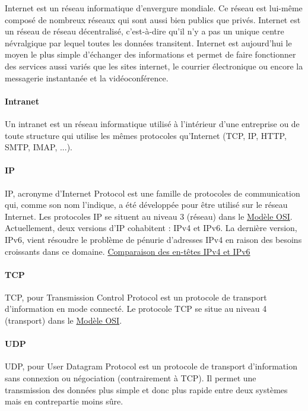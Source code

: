 \documentclass[french]{article}
\begin{document}
Internet est un réseau informatique d'envergure mondiale. Ce réseau est lui-même composé de nombreux réseaux qui sont aussi bien publics que privés. Internet est un réseau de réseau décentralisé, c'est-à-dire qu'il n'y a pas un unique centre névralgique par lequel toutes les données transitent.
Internet est aujourd'hui le moyen le plus simple d'échanger des informations et permet de faire fonctionner des services aussi variés que les sites internet, le courrier électronique ou encore la messagerie instantanée et la vidéoconférence.

\paragraph{Intranet}

Un intranet est un réseau informatique utilisé à l'intérieur d'une entreprise ou de toute structure qui utilise les mêmes protocoles qu'Internet (TCP, IP, HTTP, SMTP, IMAP, ...).

\paragraph{IP}

IP, acronyme d'Internet Protocol est une famille de protocoles de communication qui, comme son nom l'indique, a été développée pour être utilisé sur le réseau Internet.
Les protocoles IP se situent au niveau 3 (réseau) dans le \hyperlink{modele_osi}{Modèle OSI}.
Actuellement, deux versions d'IP cohabitent : IPv4 et IPv6. La dernière version, IPv6, vient résoudre le problème de pénurie d'adresses IPv4 en raison des besoins croissants dans ce domaine.
\hyperlink{ipv4_vs_ipv6}{Comparaison des en-têtes IPv4 et IPv6}

\paragraph{TCP}

TCP, pour Transmission Control Protocol est un protocole de transport d'information en mode connecté.
Le protocole TCP se situe au niveau 4 (transport) dans le \hyperlink{modele_osi}{Modèle OSI}.

\paragraph{UDP}

UDP, pour User Datagram Protocol est un protocole de transport d'information sans connexion ou négociation (contrairement à TCP).
Il permet une transmission des données plus simple et donc plus rapide entre deux systèmes mais en contrepartie moins sûre.
\end{document}
